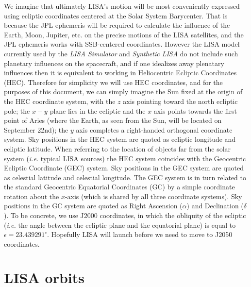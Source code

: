 \documentclass[11pt]{report}
\begin{document}
We imagine that ultimately LISA's motion will be most conveniently expressed using ecliptic coordinates centered at the Solar System Barycenter.
That is because the JPL ephemeris will be required to calculate the influence of the Earth, Moon, Jupiter, etc. on the precise motions of
the LISA satellites, and the JPL ephemeris works with SSB-centered coordinates.  However the LISA model currently used by the {\it LISA Simulator} and
{\it Synthetic LISA} do not include such planetary influences on the spacecraft, and if one idealizes away plenatary influences then it is equivalent
to working in Heliocentric Ecliptic Coordinates (HEC). Therefore for simplicity we will use HEC coordinates, and for the purposes of this document, we can 
simply imagine the Sun fixed at the origin of the HEC coordinate system, with the $z$ axis pointing toward the north ecliptic pole; the $x-y$ plane lies in the ecliptic and the $x$ axis points towards the first point of Aries (where the Earth, as seen from the Sun, will be located on September 22nd); the $y$ axis completes a right-handed orthogonal coordinate system. Sky positions in the HEC system are quoted as
ecliptic longitude and ecliptic latitude. When referring to the location of objects far from
the solar system ({\it i.e.} typical LISA sources) the HEC system coincides with the
Geocentric Ecliptic Coordinate (GEC) system. Sky positions in the GEC system are quoted as
celestial latitude and celestial longitude. The GEC system is in turn related to the standard Geocentric
Equatorial Coordinates (GC) by a simple coordinate rotation about the $x$-axis (which is shared by all
three coordinate systems). Sky positions in the GC system are quoted as Right Ascension ($\alpha$)
and Declination ($\delta$). To be concrete, we use J2000 coordinates, in which the obliquity of
the ecliptic ({\it i.e.} the angle between the ecliptic plane and the equatorial plane) is
equal to $\epsilon = 23.439291^\circ$. Hopefully LISA will launch before we need to move to
J2050 coordinates. 


\section{LISA orbits}
\label{sec:orbits}
\end{document}
